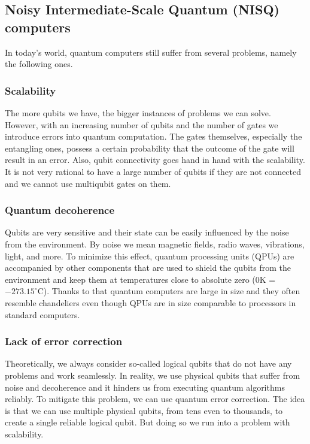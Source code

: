 \subsection{Noisy Intermediate-Scale Quantum (NISQ) computers}
In today's world, quantum computers still suffer from several problems, namely the following ones.

\subsubsection{Scalability}
The more qubits we have, the bigger instances of problems we can solve. However, with an increasing number of qubits and the number of gates we introduce errors into quantum computation. The gates themselves, especially the entangling ones, possess a certain probability that the outcome of the gate will result in an error. Also, qubit connectivity goes hand in hand with the scalability. It is not very rational to have a large number of qubits if they are not connected and we cannot use multiqubit gates on them.

\subsubsection{Quantum decoherence}
Qubits are very sensitive and their state can be easily influenced by the noise from the environment. By noise we mean magnetic fields, radio waves, vibrations, light, and more. To minimize this effect, quantum processing units (QPUs) are accompanied by other components that are used to shield the qubits from the environment and keep them at temperatures close to absolute zero ($0$K = $-273.15^{\circ}$C). Thanks to that quantum computers are large in size and they often resemble chandeliers even though QPUs are in size comparable to processors in standard computers.

\subsubsection{Lack of error correction}
Theoretically, we always consider so-called logical qubits that do not have any problems and work seamlessly. In reality, we use physical qubits that suffer from noise and decoherence and it hinders us from executing quantum algorithms reliably. To mitigate this problem, we can use quantum error correction. The idea is that we can use multiple physical qubits, from tens even to thousands, to create a single reliable logical qubit. But doing so we run into a problem with scalability. 

